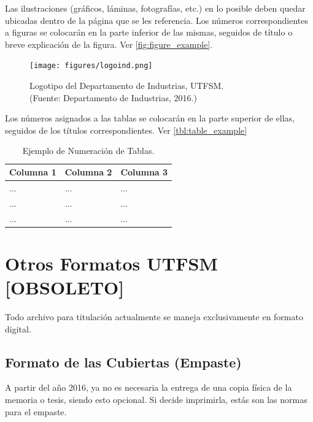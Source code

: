 \begin{description}
Las ilustraciones (gráficos, láminas, fotografías, etc.) en lo posible deben quedar ubicadas dentro de la página que se les referencia. Los números correspondientes a figuras se colocarán en la parte inferior de las mismas, seguidos de título o breve explicación de la figura. Ver \autoref{fig:figure_example}.
	\begin{figure}[ht!]
	\centering
	\texttt{[image: figures/logoind.png]}
	
	\caption[Logotipo del Departamento de Industrias, UTFSM.]{Logotipo del Departamento de Industrias, UTFSM.\\
	{\footnotesize (Fuente: Departamento de Industrias, 2016.)}}
	
	\label{fig:figure_example}
	\end{figure}

Los números asignados a las tablas se colocarán en la parte superior de ellas, seguidos de los títulos correspondientes. Ver \autoref{tbl:table_example}

\begin{table}[ht]
    \centering
    \caption[Ejemplo: Numeración de Tablas]{Ejemplo de Numeración de Tablas.}
    \begin{tabular}{@{}p{3cm}|p{3cm}|p{3cm}@{}}
        \toprule
        \textbf{Columna 1} & \textbf{Columna 2} & \textbf{Columna 3} \\
        \hline\hline
        ... & ... & ... \\
        \hline
        ... & ... & ... \\
        \hline
        ... & ... & ... \\
        \bottomrule
    \end{tabular}
    \label{tbl:table_example}
\end{table}

\end{description}

\section{Otros Formatos UTFSM [OBSOLETO]}

Todo archivo para titulación actualmente se maneja exclusivamente en formato digital.

\subsection{Formato de las Cubiertas (Empaste)}

A partir del año 2016, ya no es necesaria la entrega de una copia física de la memoria o tesis, siendo esto opcional. Si decide imprimirla, estás son las normas para el empaste.

